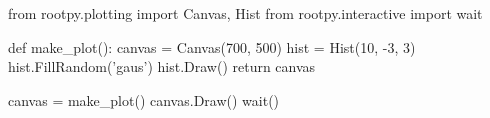 \begin{footnotesize}
\begin{pyglist}[language=python,texcl=true,style=vs,bgcolor=Moccasin]
from rootpy.plotting import Canvas, Hist
from rootpy.interactive import wait

def make_plot():
    canvas = Canvas(700, 500)
    hist = Hist(10, -3, 3)
    hist.FillRandom('gaus')
    hist.Draw()
    return canvas

canvas = make_plot()
canvas.Draw()
wait()
\end{pyglist}
\end{footnotesize}
